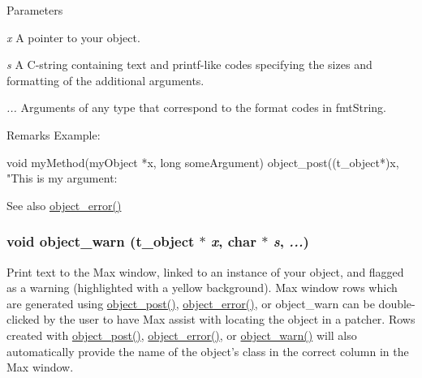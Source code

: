 \begin{DoxyParams}{Parameters}
\item[{\em x}]A pointer to your object. \item[{\em s}]A C-\/string containing text and printf-\/like codes specifying the sizes and formatting of the additional arguments. \item[{\em ...}]Arguments of any type that correspond to the format codes in fmtString.\end{DoxyParams}
\begin{DoxyRemark}{Remarks}
Example: 
\begin{DoxyCode}
    void myMethod(myObject *x, long someArgument)
    {
        object_post((t_object*)x, "This is my argument: %
    }
\end{DoxyCode}

\end{DoxyRemark}
\begin{DoxySeeAlso}{See also}
\hyperlink{group__console_ga05f7fed66fafc6e4d2e372b7f0fe4e43}{object\_\-error()} 
\end{DoxySeeAlso}
\hypertarget{group__console_ga7ab11c5e9e345384ad282fcd5b86275c}{
\subsubsection[{object\_\-warn}]{\setlength{\rightskip}{0pt plus 5cm}void object\_\-warn ({\bf t\_\-object} $\ast$ {\em x}, \/  char $\ast$ {\em s}, \/   {\em ...})}}
\label{group__console_ga7ab11c5e9e345384ad282fcd5b86275c}


Print text to the Max window, linked to an instance of your object, and flagged as a warning (highlighted with a yellow background). Max window rows which are generated using \hyperlink{group__console_gafb92b17363269d4d26de1823cbc2492d}{object\_\-post()}, \hyperlink{group__console_ga05f7fed66fafc6e4d2e372b7f0fe4e43}{object\_\-error()}, or object\_\-warn can be double-\/clicked by the user to have Max assist with locating the object in a patcher. Rows created with \hyperlink{group__console_gafb92b17363269d4d26de1823cbc2492d}{object\_\-post()}, \hyperlink{group__console_ga05f7fed66fafc6e4d2e372b7f0fe4e43}{object\_\-error()}, or \hyperlink{group__console_ga7ab11c5e9e345384ad282fcd5b86275c}{object\_\-warn()} will also automatically provide the name of the object's class in the correct column in the Max window.


